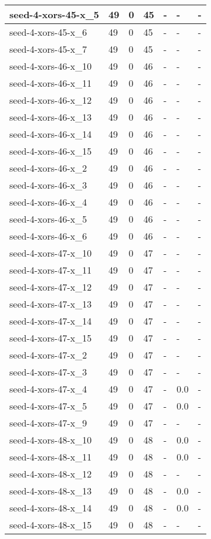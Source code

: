 \begin{scriptsize}
\begin{longtable}{|p{5cm}|l|l|l|l|l|l|}
seed-4-xors-45-x\_5&49&0&45&-&-&- \\ \hline 
seed-4-xors-45-x\_6&49&0&45&-&-&- \\ \hline 
seed-4-xors-45-x\_7&49&0&45&-&-&- \\ \hline 
seed-4-xors-46-x\_10&49&0&46&-&-&- \\ \hline 
seed-4-xors-46-x\_11&49&0&46&-&-&- \\ \hline 
seed-4-xors-46-x\_12&49&0&46&-&-&- \\ \hline 
seed-4-xors-46-x\_13&49&0&46&-&-&- \\ \hline 
seed-4-xors-46-x\_14&49&0&46&-&-&- \\ \hline 
seed-4-xors-46-x\_15&49&0&46&-&-&- \\ \hline 
seed-4-xors-46-x\_2&49&0&46&-&-&- \\ \hline 
seed-4-xors-46-x\_3&49&0&46&-&-&- \\ \hline 
seed-4-xors-46-x\_4&49&0&46&-&-&- \\ \hline 
seed-4-xors-46-x\_5&49&0&46&-&-&- \\ \hline 
seed-4-xors-46-x\_6&49&0&46&-&-&- \\ \hline 
seed-4-xors-47-x\_10&49&0&47&-&-&- \\ \hline 
seed-4-xors-47-x\_11&49&0&47&-&-&- \\ \hline 
seed-4-xors-47-x\_12&49&0&47&-&-&- \\ \hline 
seed-4-xors-47-x\_13&49&0&47&-&-&- \\ \hline 
seed-4-xors-47-x\_14&49&0&47&-&-&- \\ \hline 
seed-4-xors-47-x\_15&49&0&47&-&-&- \\ \hline 
seed-4-xors-47-x\_2&49&0&47&-&-&- \\ \hline 
seed-4-xors-47-x\_3&49&0&47&-&-&- \\ \hline 
seed-4-xors-47-x\_4&49&0&47&-&0.0&- \\ \hline 
seed-4-xors-47-x\_5&49&0&47&-&0.0&- \\ \hline 
seed-4-xors-47-x\_9&49&0&47&-&-&- \\ \hline 
seed-4-xors-48-x\_10&49&0&48&-&0.0&- \\ \hline 
seed-4-xors-48-x\_11&49&0&48&-&0.0&- \\ \hline 
seed-4-xors-48-x\_12&49&0&48&-&-&- \\ \hline 
seed-4-xors-48-x\_13&49&0&48&-&0.0&- \\ \hline 
seed-4-xors-48-x\_14&49&0&48&-&0.0&- \\ \hline 
seed-4-xors-48-x\_15&49&0&48&-&-&- \\ \hline 

\end{longtable}
\end{scriptsize}
